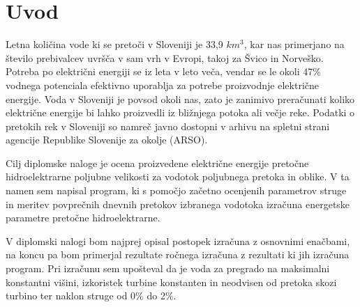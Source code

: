 
\chapter{Uvod}\label{sec: Uvod}
\thispagestyle{fancy}



Letna količina vode ki se pretoči v Sloveniji je 33,9 $km^{3}$, kar nas primerjano na število prebivalcev uvršča v sam vrh v Evropi, takoj za Švico in Norveško. Potreba po električni energiji se iz leta v leto veča, vendar se le okoli 47\% vodnega potenciala efektivno uporablja za potrebe proizvodnje električne energije. Voda v Sloveniji je povsod okoli nas, zato je zanimivo preračunati koliko električne energije bi lahko proizvedli iz bližnjega potoka ali večje reke. Podatki o pretokih rek v Sloveniji so namreč javno dostopni v arhivu na spletni strani agencije Republike Slovenije za okolje (ARSO). \cite{HEnaSrednjiSavi}


Cilj diplomske naloge je ocena proizvedene električne energije pretočne hidroelektrarne poljubne velikosti za vodotok poljubnega pretoka in oblike. V ta namen sem napisal program, ki s pomočjo začetno ocenjenih parametrov struge in meritev povprečnih dnevnih pretokov izbranega vodotoka izračuna energetske parametre pretočne hidroelektrarne. 


V diplomski nalogi bom najprej opisal postopek izračuna z osnovnimi enačbami, na koncu pa bom primerjal rezultate ročnega izračuna z rezultati ki jih izračuna program. Pri izračunu sem upošteval da je voda za pregrado na maksimalni konstantni višini, izkoristek turbine konstanten in neodvisen od pretoka skozi turbino ter naklon struge od 0\% do 2\%.



